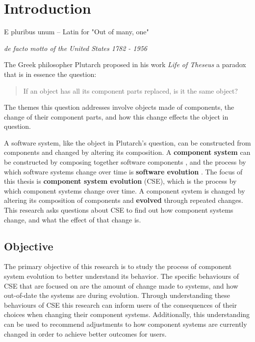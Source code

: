 \chapter{Introduction}
\label{introduction}
\epigraph{E pluribus unum -- Latin for "Out of many, one"}
{\textit{de facto motto of the United States 1782 - 1956}}
The Greek philosopher Plutarch proposed in his work \textit{Life of Theseus} a paradox that is in essence the question:
\begin{quote}
If an object has all its component parts replaced, is it the same object?
\end{quote}
The themes this question addresses involve objects made of components, the change of their component parts,
and how this change effects the object in question.

A software system, like the object in Plutarch's question, can be constructed from components and changed by altering its composition.
A \textbf{component system} can be constructed by composing together software components \citep{Szyperski2002},
and the process by which software systems change over time is \textbf{software evolution} \citep{lehman1980}.
The focus of this thesis is \textbf{component system evolution} (CSE), which is the process by which component systems change over time.
A component system is changed by altering its composition of components and \textbf{evolved} through repeated changes.
This research asks questions about CSE to find out how component systems change, and what the effect of that change is.

\section{Objective}
The primary objective of this research is to study the process of component system evolution to better understand its behavior.
The specific behaviours of CSE that are focused on are the amount of change made to systems, and how out-of-date the systems are during evolution.
Through understanding these behaviours of CSE this research can inform users of the consequences of their choices when changing their component systems.
Additionally, this understanding can be used to recommend adjustments to how component systems are currently changed in order to achieve better outcomes for users. 

